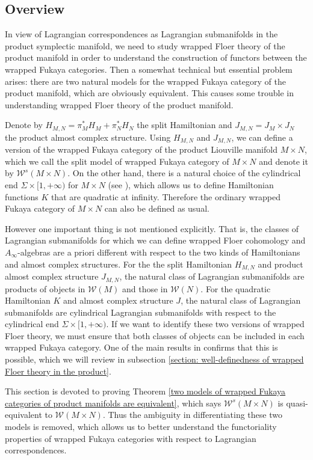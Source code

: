 \documentclass{amsart}
\numberwithin{equation}{section}
\numberwithin{figure}{section}
\begin{document}
\subsection{Overview}
	In view of Lagrangian correspondences as Lagrangian submanifolds in the product symplectic manifold, we need to study wrapped Floer theory of the product manifold in order to understand the construction of functors between the wrapped Fukaya categories. Then a somewhat technical but essential problem arises: there are two natural models for the wrapped Fukaya category of the product manifold, which are obviously equivalent. This causes some trouble in understanding wrapped Floer theory of the product manifold. \par
	Denote by $H_{M, N} = \pi_{M}^{*}H_{M} + \pi_{N}^{*}H_{N}$ the split Hamiltonian and $J_{M, N} = J_{M} \times J_{N}$ the product almost complex structure. Using $H_{M, N}$ and $J_{M, N}$, we can define a version of the wrapped Fukaya category of the product Liouville manifold $M \times N$, which we call the split model of wrapped Fukaya category of $M \times N$ and denote it by $\mathcal{W}^{s}(M \times N)$. On the other hand, there is a natural choice of the cylindrical end $\Sigma \times [1, +\infty)$ for $M \times N$ (see \cite{Gao1}), which allows us to define Hamiltonian functions $K$ that are quadratic at infinity. Therefore the ordinary wrapped Fukaya category of $M \times N$ can also be defined as usual. \par
	However one important thing is not mentioned explicitly. That is, the classes of Lagrangian submanifolds for which we can define wrapped Floer cohomology and $A_{\infty}$-algebras are a priori different with respect to the two kinds of Hamiltonians and almost complex structures. For the the split Hamiltonian $H_{M, N}$ and product almost complex structure $J_{M, N}$, the natural class of Lagrangian submanifolds are products of objects in $\mathcal{W}(M)$ and those in $\mathcal{W}(N)$. For the quadratic Hamiltonian $K$ and almost complex structure $J$, the natural class of Lagrangian submanifolds are cylindrical Lagrangian submanifolds with respect to the cylindrical end $\Sigma \times [1, +\infty)$. If we want to identify these two versions of wrapped Floer theory, we must ensure that both classes of objects can be included in each wrapped Fukaya category. One of the main results in \cite{Gao1} confirms that this is possible, which we will review in subsection \ref{section: well-definedness of wrapped Floer theory in the product}. \par
	This section is devoted to proving Theorem \ref{two models of wrapped Fukaya categories of product manifolds are equivalent}, which says $\mathcal{W}^{s}(M \times N)$ is quasi-equivalent to $\mathcal{W}(M \times N)$. Thus the ambiguity in differentiating these two models is removed, which allows us to better understand the functoriality properties of wrapped Fukaya categories with respect to Lagrangian correspondences. \par
\end{document}
